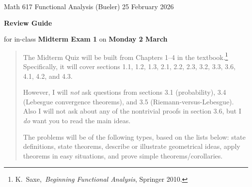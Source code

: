 \documentclass[12pt]{amsart}
\newcommand{\textbook}{K.~Saxe,~\emph{Beginning Functional Analysis}, Springer 2010.}
\begin{document}
\scriptsize \noindent Math 617 Functional Analysis (Bueler) \hfill 25 February 2026
\thispagestyle{empty}

\bigskip
\LARGE\centerline{\textbf{Review Guide}}

\medskip
\Large\centerline{for in-class \textbf{Midterm Exam 1} on \textbf{Monday 2 March}}

\normalsize
\bigskip
\begin{quote}
The Midterm Quiz will be built from Chapters 1--4 in the textbook.\footnote{\textbook}  Specifically, it will cover sections 1.1, 1.2, 1.3, 2.1, 2.2, 2.3, 3.2, 3.3, 3.6, 4.1, 4.2, and 4.3.

However, I will \emph{not} ask questions from sections 3.1 (probability), 3.4 (Lebesgue convergence theorems), and 3.5 (Riemann-versus-Lebesgue).  Also I will not ask about any of the nontrivial proofs in section 3.6, but I \emph{do} want you to read the main ideas.

The problems will be of the following types, based on the lists below: state definitions, state theorems, describe or illustrate geometrical ideas, apply theorems in easy situations, and prove simple theorems/corollaries.
\end{quote}
\bigskip
\end{document}
